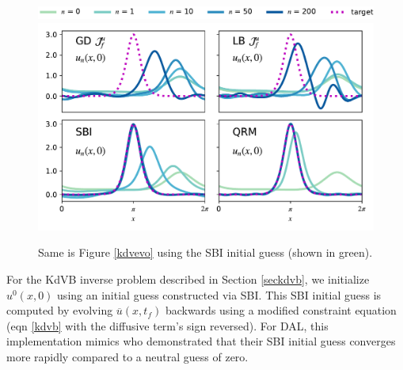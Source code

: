 \documentclass[%
 reprint,
 amsmath,amssymb,
 aps,
 pre,
]{revtex4-2}
\newcommand{\Juf}{\mathcal{J}^{u}_f}
\begin{document}
\begin{figure}
  \centering
  \includegraphics[width=5.0in]{legend_kdvb.pdf} \\
  \includegraphics[width=5.0in]{PLTD/sall.pdf}
  \caption{Same is Figure \ref{kdvevo} using the SBI initial guess (shown in green).
  }
  \label{skdvevo}
\end{figure}

For the KdVB inverse problem described in Section \ref{seckdvb}, we initialize $u^0(x,0)$ using an initial guess constructed via SBI.
This SBI initial guess is computed by evolving $\overline{u}(x,t_f)$ backwards using a modified constraint equation (eqn \ref{kdvb} with the diffusive term's sign reversed). 
For DAL, this implementation mimics \cite{Li2017,Liu2008} who demonstrated that their SBI initial guess converges more rapidly compared to a neutral guess of zero.
\end{document}
